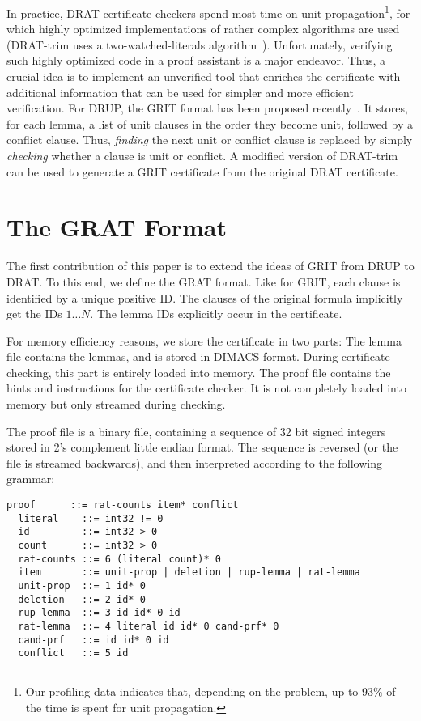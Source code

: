 \documentclass[smallcondensed]{svjour3}     %
\begin{document}
In practice, DRAT certificate checkers spend most time on unit propagation\footnote{Our profiling data indicates that, depending on the problem, up to 93\% of the time is spent for unit propagation.}, for which highly optimized implementations of rather complex algorithms 
are used (\eg DRAT-trim uses a two-watched-literals algorithm~\cite{MMZZ01}).
Unfortunately, verifying such highly optimized code in a proof assistant is a major endeavor.
Thus, a crucial idea is to implement an unverified tool that enriches the certificate with additional information that can be used for simpler and more efficient verification.
For DRUP, the GRIT format has been proposed recently~\cite{CMS17}. 
It stores, for each lemma, a list of unit clauses in the order they become unit, followed by a conflict clause.
Thus, \emph{finding} the next unit or conflict clause is replaced by 
simply \emph{checking} whether a clause is unit or conflict. A modified version of DRAT-trim can be used to generate a GRIT certificate from the original DRAT certificate.


\section{The GRAT Format}\label{sec:grat-format}
The first contribution of this paper is to extend the ideas of GRIT from DRUP to DRAT.
To this end, we define the GRAT format. 
Like for GRIT, each clause is identified by a unique positive ID. 
The clauses of the original formula implicitly get the IDs $1\ldots N$. The lemma IDs explicitly occur in the certificate.

For memory efficiency reasons, we store the certificate in two parts: The lemma file contains the lemmas, and is stored in DIMACS format.
During certificate checking, this part is entirely loaded into memory.
The proof file contains the hints and instructions for the certificate checker. It is not completely loaded into memory but only streamed during checking.

The proof file is a binary file, containing a sequence of 32 bit signed integers stored in 2's complement little endian format. 
The sequence is reversed (or the file is streamed backwards), and then interpreted according to the following grammar:
\begin{lstlisting}[language={},columns={[c]fullflexible},literate={}]
  proof      ::= rat-counts item* conflict
  literal    ::= int32 != 0
  id         ::= int32 > 0
  count      ::= int32 > 0
  rat-counts ::= 6 (literal count)* 0
  item       ::= unit-prop | deletion | rup-lemma | rat-lemma
  unit-prop  ::= 1 id* 0
  deletion   ::= 2 id* 0
  rup-lemma  ::= 3 id id* 0 id
  rat-lemma  ::= 4 literal id id* 0 cand-prf* 0
  cand-prf   ::= id id* 0 id
  conflict   ::= 5 id
\end{lstlisting}
\end{document}
